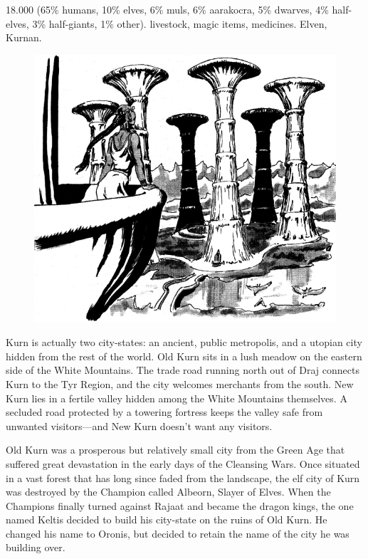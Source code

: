 
{18.000 (65\% humans, 10\% elves, 6\% muls, 6\% aarakocra, 5\% dwarves, 4\% half-elves, 3\% half-giants, 1\% other).}
{livestock, magic items, medicines.}
{Elven, Kurnan.}
{
\begin{figure}[b!]
\centering
\includegraphics[height=0.4\paperheight]{images/kurn-1.png}
\end{figure}
	Kurn is actually two city-states: an ancient, public metropolis, and a utopian city hidden from the rest of the world. Old Kurn sits in a lush meadow on the eastern side of the White Mountains. The trade road running north out of Draj connects Kurn to the Tyr Region, and the city welcomes merchants from the south. New Kurn lies in a fertile valley hidden among the White Mountains themselves. A secluded road protected by a towering fortress keeps the valley safe from unwanted visitors---and New Kurn doesn't want any visitors.

	Old Kurn was a prosperous but relatively small city from the Green Age that suffered great devastation in the early days of the Cleansing Wars. Once situated in a vast forest that has long since faded from the landscape, the elf city of Kurn was destroyed by the Champion called Albeorn, Slayer of Elves. When the Champions finally turned against Rajaat and became the dragon kings, the one named Keltis decided to build his city-state on the ruins of Old Kurn. He changed his name to Oronis, but decided to retain the name of the city he was building over.

}
